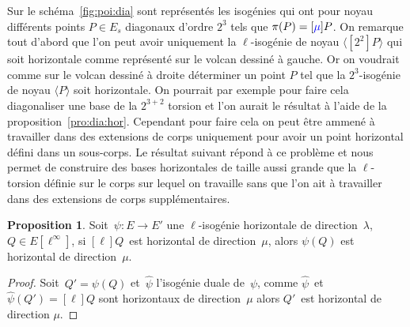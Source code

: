 \documentclass[10pt,a4paper]{book}
\theoremstyle{plain}
\theoremstyle{definition}
\theoremstyle{definition}
\theoremstyle{definition}
\newtheorem{prop}[thm]{Proposition}
\theoremstyle{definition}
\theoremstyle{remark}
\theoremstyle{remark}
\theoremstyle{definition}
\begin{document}
Sur le schéma~\ref{fig:poi:dia} sont représentés les isogénies qui ont pour 
noyau différents points $P \in E_s $ diagonaux d'ordre $2^3$ tels que $\pi(P)=
[\color{blue}\mu \color{black}]P$. On remarque tout d'abord que l'on peut avoir
uniquement la $\ell$-isogénie de noyau $\langle [2^2]P \rangle$ qui soit 
horizontale comme représenté sur le volcan dessiné à gauche. Or on voudrait 
comme sur le volcan dessiné à droite déterminer un point $P$ tel que la 
$2^3$-isogénie de noyau $\langle P \rangle$ soit horizontale. On pourrait par 
exemple pour faire cela diagonaliser une base de la $2^{3+2}$ torsion et l'on 
aurait le résultat à l'aide de la proposition~\ref{pro:dia:hor}. Cependant pour
faire cela on peut être ammené à travailler dans des extensions de corps 
uniquement pour avoir un point horizontal défini dans un sous-corps. Le 
résultat suivant répond à ce problème et nous permet de construire des bases 
horizontales de taille aussi grande que la $\ell$-torsion définie sur le corps 
sur lequel on travaille sans que l'on ait à travailler dans des extensions de 
corps supplémentaires.

\begin{prop}\label{pro:pus:hor}
Soit~$\psi: E \rightarrow E'$ une $\ell$-isogénie horizontale de direction~$\lambda$,
$Q \in E[\ell^{\infty}]$,
si $[\ell] Q$~est horizontal de direction~$\mu$,
alors $\psi(Q)$ est horizontal de direction~$\mu$.
\end{prop}
\begin{proof}
Soit~$Q' = \psi(Q)$ et~$\widehat{\psi}$ l'isogénie duale de~$\psi$, 
comme $\widehat{\psi}$~et~$\widehat{\psi}(Q') = [\ell]Q$ sont horizontaux
de direction~$\mu$ alors $Q'$~est horizontal de direction $\mu$.
\end{proof}
\end{document}
